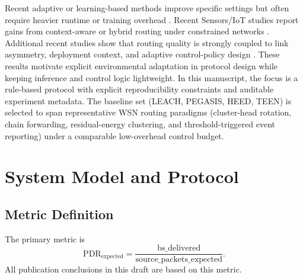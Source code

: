 ﻿\documentclass[sensors,article,submit,moreauthors,pdftex]{Definitions/mdpi}
\begin{document}
Recent adaptive or learning-based methods improve specific settings but often require heavier runtime or training overhead \cite{Ren2024,Okine2024,Chen2019Survey,Naeem2024DRL,Scientific2025DRLGNN,Nature2024NNILEACH,AI2025Survey,Manogaran2025DDQN,Tan2026MOGALSA}. Recent Sensors/IoT studies report gains from context-aware or hybrid routing under constrained networks \cite{ElFouly2023ILP,Dan2024EMRAR,Bhukya2025Hybrid,Kaddi2024GWOCSMA,Wang2024Geographic,Tariq2024A,Hassanien2025DLHEED,Ti2026HEOCP,Juwaied2025DEEC}. Additional recent studies show that routing quality is strongly coupled to link asymmetry, deployment context, and adaptive control-policy design \cite{Qin2024NLOSError,Jain2025Optimized,Ogundile2025PPRP,Singh2025Enhanced,Tossa2025Deployment,Prince2025Hotspot,Qin2026WBAN}. These results motivate explicit environmental adaptation in protocol design while keeping inference and control logic lightweight. In this manuscript, the focus is a rule-based protocol with explicit reproducibility constraints and auditable experiment metadata.
The baseline set (LEACH, PEGASIS, HEED, TEEN) is selected to span representative WSN routing paradigms (cluster-head rotation, chain forwarding, residual-energy clustering, and threshold-triggered event reporting) under a comparable low-overhead control budget.

\section{System Model and Protocol}
\subsection{Metric Definition}
The primary metric is
\begin{equation}
\mathrm{PDR}_{\mathrm{expected}} = \frac{\mathrm{bs\_delivered}}{\mathrm{source\_packets\_expected}}.
\end{equation}
All publication conclusions in this draft are based on this metric.
\end{document}
